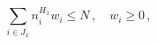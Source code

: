 \begin{equation} \label{lessn_sub_n}
\sum_{i \in J_x} n_i^{H_x} w_i \le N\,, \quad w_i\ge 0\,,
\end{equation}

